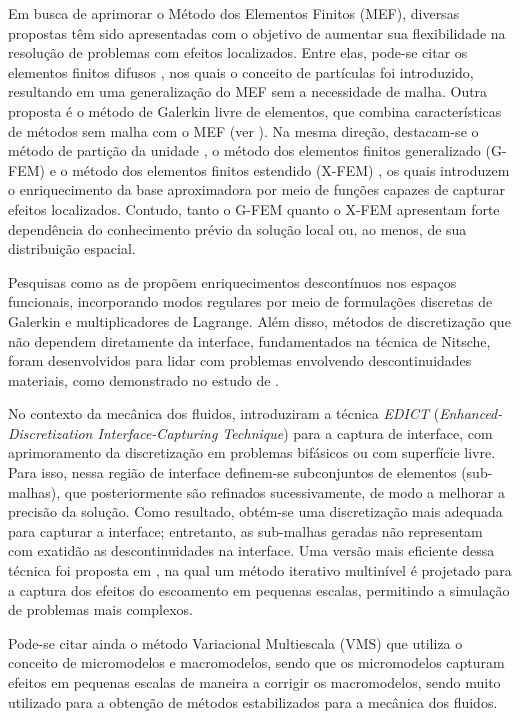 \documentclass[tese_patricia.tex]{subfiles}
\begin{document}
Em busca de aprimorar o Método dos Elementos Finitos (MEF), diversas propostas têm sido apresentadas com o objetivo de aumentar sua flexibilidade na resolução de problemas com efeitos localizados. Entre elas, pode-se citar os elementos finitos difusos \cite{NayrolesTV:1992}, nos quais o conceito de partículas foi introduzido, resultando em uma generalização do MEF sem a necessidade de malha. Outra proposta é o método de Galerkin livre de elementos, que combina características de métodos sem malha com o MEF (ver ). Na mesma direção, destacam-se o método de partição da unidade \cite{MelenkB:1996}, o método dos elementos finitos generalizado (G-FEM) \cite{StrouboulisCB:2001} e o método dos elementos finitos estendido (X-FEM) \cite{Moes:2003}, os quais introduzem o enriquecimento da base aproximadora por meio de funções capazes de capturar efeitos localizados. Contudo, tanto o G-FEM quanto o X-FEM apresentam forte dependência do conhecimento prévio da solução local ou, ao menos, de sua distribuição espacial.

Pesquisas como as de  propõem enriquecimentos descontínuos nos espaços funcionais, incorporando modos regulares por meio de formulações discretas de Galerkin e multiplicadores de Lagrange. Além disso, métodos de discretização que não dependem diretamente da interface, fundamentados na técnica de Nitsche, foram desenvolvidos para lidar com problemas envolvendo descontinuidades materiais, como demonstrado no estudo de .

No contexto da mecânica dos fluidos,  introduziram a técnica \textit{EDICT} (\textit{Enhanced-Discretization Interface-Capturing Technique}) para a captura de interface, com aprimoramento da discretização em problemas bifásicos ou com superfície livre. Para isso, nessa região de interface definem-se subconjuntos de elementos (sub-malhas), que posteriormente são refinados sucessivamente, de modo a melhorar a precisão da solução. Como resultado, obtém-se uma discretização mais adequada para capturar a interface; entretanto, as sub-malhas geradas não representam com exatidão as descontinuidades na interface. Uma versão mais eficiente dessa técnica foi proposta em , na qual um método iterativo multinível é projetado para a captura dos efeitos do escoamento em pequenas escalas, permitindo a simulação de problemas mais complexos.

Pode-se citar ainda o método Variacional Multiescala (VMS) \cite{Hughesetal:1998} que utiliza o conceito de micromodelos e macromodelos, sendo que os micromodelos capturam efeitos em pequenas escalas de maneira a corrigir os macromodelos, sendo muito utilizado para a obtenção de métodos estabilizados para a mecânica dos fluidos.
\end{document}
